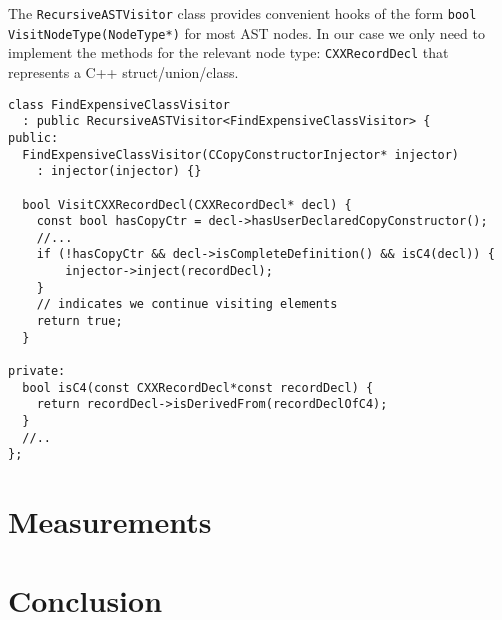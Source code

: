 \documentclass{article}
\begin{document}
The \texttt{RecursiveASTVisitor} class provides convenient hooks of the form \texttt{bool VisitNodeType(NodeType*)} for most AST nodes. In our case we only need to implement the methods for the relevant node type: \texttt{CXXRecordDecl} that represents a C++ struct/union/class.

\begin{verbatim}
class FindExpensiveClassVisitor
  : public RecursiveASTVisitor<FindExpensiveClassVisitor> {
public:
  FindExpensiveClassVisitor(CCopyConstructorInjector* injector)
    : injector(injector) {}

  bool VisitCXXRecordDecl(CXXRecordDecl* decl) {
    const bool hasCopyCtr = decl->hasUserDeclaredCopyConstructor();
    //...
    if (!hasCopyCtr && decl->isCompleteDefinition() && isC4(decl)) {
   	    injector->inject(recordDecl);
    }
    // indicates we continue visiting elements
    return true;
  }

private:
  bool isC4(const CXXRecordDecl*const recordDecl) {
    return recordDecl->isDerivedFrom(recordDeclOfC4);
  }
  //..
};
\end{verbatim}



\section{Measurements}
\label{measurements}

\section{Conclusion}
\label{conc}
\end{document}

